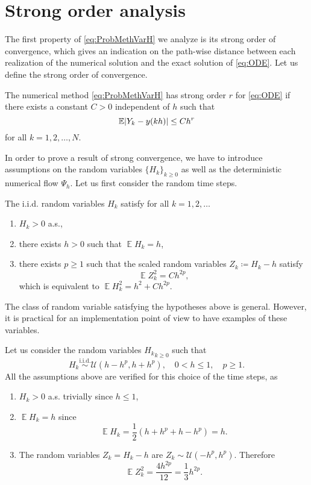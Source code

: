 \documentclass{siamart1116}
\numberwithin{theorem}{section}
\DeclarePairedDelimiter{\abs}{\lvert}{\rvert}
\newcommand{\iid}{\ensuremath{\stackrel{\text{i.i.d.}}{\sim}}}
\newcommand{\defeq}{\coloneqq}
\newcommand{\E}{\operatorname{\mathbb{E}}}
\begin{document}
\section{Strong order analysis}

The first property of \eqref{eq:ProbMethVarH} we analyze is its strong order of convergence, which gives an indication on the path-wise distance between each realization of the numerical solution and the exact solution of \eqref{eq:ODE}. Let us define the strong order of convergence. 
\begin{definition} The numerical method \eqref{eq:ProbMethVarH} has strong order $r$ for \eqref{eq:ODE} if there exists a constant $C > 0$ independent of $h$ such that
	\begin{equation}
	\E\abs{Y_k - y(kh)} \leq Ch^r
	\end{equation}
	for all $k = 1, 2, \ldots, N$.
\end{definition} 
In order to prove a result of strong convergence, we have to introduce assumptions on the random variables $\{H_k\}_{k\geq 0}$ as well as the deterministic numerical flow $\Psi_h$. Let us first consider the random time steps.
\begin{assumption}\label{as:hStrong} The i.i.d. random variables $H_k$ satisfy for all $k = 1, 2, \ldots$
	\begin{enumerate}
		\item $H_k > 0$ a.s.,
		\item there exists $h > 0$ such that $\E H_k = h$,
		\item there exists $p \geq 1$ such that the scaled random variables $Z_k \defeq H_k - h$ satisfy
		\begin{equation}
			\E Z_k^2 = Ch^{2p},
		\end{equation}
		which is equivalent to $\E H_k^2 = h^2 + Ch^{2p}$.
	\end{enumerate}
\end{assumption}
The class of random variable satisfying the hypotheses above is general. However, it is practical for an implementation point of view to have examples of these variables.
\begin{example}\label{ex:uniformH} Let us consider the random variables ${H_k}_{k\geq 0}$ such that
	\begin{equation}
		H_k \iid \mathcal{U}(h-h^p, h+h^p), \quad 0 < h \leq 1, \quad p \geq 1.
	\end{equation}
	All the assumptions above are verified for this choice of the time steps, as
	\begin{enumerate}
		\item $H_k > 0$ a.s. trivially since $h \leq 1$,
		\item $\E H_k = h$ since 
		\begin{equation}
			\E H_k = \frac{1}{2}(h + h^p + h - h^p) = h.
		\end{equation}
		\item The random variables $Z_k = H_k - h$ are $Z_k \sim \mathcal{U}(-h^p, h^p)$. Therefore
		\begin{equation}
			\E Z_k^2 = \frac{4h^{2p}}{12} = \frac{1}{3}h^{2p}.
		\end{equation}
	\end{enumerate}
\end{example}
\end{document}
